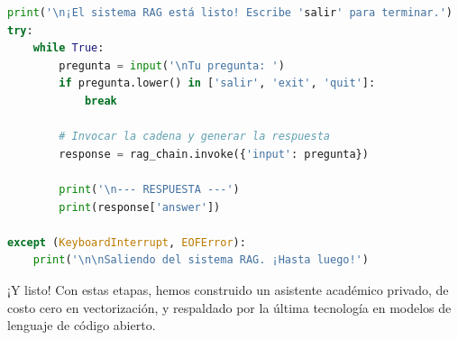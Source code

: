 \documentclass[12pt,a4paper]{article}
\begin{document}
\begin{lstlisting}[language=Python]
print('\n¡El sistema RAG está listo! Escribe 'salir' para terminar.')
try:
    while True:
        pregunta = input('\nTu pregunta: ')
        if pregunta.lower() in ['salir', 'exit', 'quit']:
            break
            
        # Invocar la cadena y generar la respuesta
        response = rag_chain.invoke({'input': pregunta})

        print('\n--- RESPUESTA ---')
        print(response['answer'])

except (KeyboardInterrupt, EOFError):
    print('\n\nSaliendo del sistema RAG. ¡Hasta luego!')
\end{lstlisting}

¡Y listo! Con estas etapas, hemos construido un asistente académico privado, de costo cero en vectorización, y respaldado por la última tecnología en modelos de lenguaje de código abierto.
\end{document}
